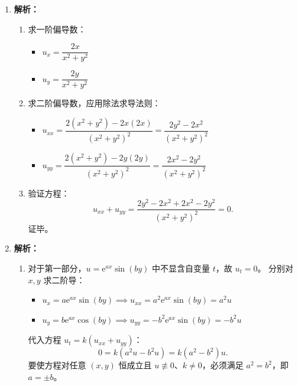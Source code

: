 \documentclass[lang=cn,11pt]{elegantbook}
\begin{document}
\begin{solution}
\begin{enumerate}
  \item[(1)] \textbf{解析：}
  \begin{enumerate}
      \item 求一阶偏导数：
      \begin{itemize}
          \item $u_x = \dfrac{2x}{x^2+y^2}$
          \item $u_y = \dfrac{2y}{x^2+y^2}$
      \end{itemize}
      \item 求二阶偏导数，应用除法求导法则：
      \begin{itemize}
          \item $u_{xx} = \dfrac{2(x^2+y^2) - 2x(2x)}{(x^2+y^2)^2} = \dfrac{2y^2-2x^2}{(x^2+y^2)^2}$
          \item $u_{yy} = \dfrac{2(x^2+y^2) - 2y(2y)}{(x^2+y^2)^2} = \dfrac{2x^2-2y^2}{(x^2+y^2)^2}$
      \end{itemize}
      \item 验证方程：
      \[
      u_{xx} + u_{yy} = \frac{2y^2-2x^2 + 2x^2-2y^2}{(x^2+y^2)^2} = 0.
      \]
      证毕。
  \end{enumerate}

  \item[(2)] \textbf{解析：}
  \begin{enumerate}
      \item 对于第一部分，$u=\mathrm{e}^{ax}\sin(by)$ 中不显含自变量 $t$，故 $u_t = 0$。
      分别对 $x,y$ 求二阶导：
      \begin{itemize}
          \item $u_x = a\mathrm{e}^{ax}\sin(by) \implies u_{xx} = a^2\mathrm{e}^{ax}\sin(by) = a^2 u$
          \item $u_y = b\mathrm{e}^{ax}\cos(by) \implies u_{yy} = -b^2\mathrm{e}^{ax}\sin(by) = -b^2 u$
      \end{itemize}
      代入方程 $u_t=k(u_{xx}+u_{yy})$：
      \[
      0 = k(a^2u - b^2u) = k(a^2-b^2)u.
      \]
      要使方程对任意 $(x,y)$ 恒成立且 $u \not\equiv 0$、$k \neq 0$，必须满足 $a^2 = b^2$，即 $a = \pm b$。
      

\end{enumerate}
\end{enumerate}
\end{solution}
\end{document}
